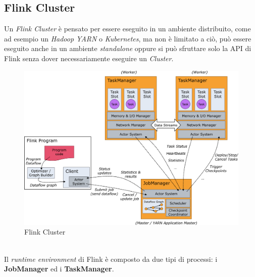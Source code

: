 \subsection{Flink Cluster}
\label{subsec:flink_cluster}
Un \textit{Flink Cluster} è pensato per essere eseguito in un ambiente distribuito, come ad esempio un \textit{Hadoop YARN} o \textit{Kubernetes},
ma non è limitato a ciò, può essere eseguito anche in un ambiente \textit{standalone} oppure si può sfruttare solo la API di Flink senza dover necessariamente eseguire un \textit{Cluster}.
\begin{figure}[htbp]
    \centering
    \includegraphics[width=\textwidth]{images/flink/cluster.jpg}
    \caption{Flink Cluster}
    \label{fig:flink_cluster}
\end{figure}
\\Il \textit{runtime environment} di Flink è composto da due tipi di processi: i \textbf{JobManager} ed i \textbf{TaskManager}.
